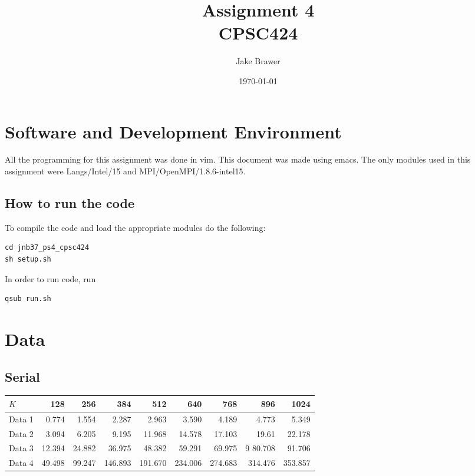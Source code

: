 \documentclass[11pt]{article}
\author{Jake Brawer}
\date{\today}
\title{Assignment 4\\\medskip
\large CPSC424}
\begin{document}
\maketitle


\section{Software and Development Environment}
\label{sec:org0f8da43}

All the programming for this assignment was done in vim. This document was made using emacs. The only modules used in this assignment were Langs/Intel/15 and MPI/OpenMPI/1.8.6-intel15.

\subsection{How to run the code}
\label{sec:orgbd0ddcf}

To compile the code and load the appropriate modules do the following:
\begin{verbatim}
cd jnb37_ps4_cpsc424
sh setup.sh
\end{verbatim}

In order to run code, run
\begin{verbatim}
qsub run.sh
\end{verbatim}

\section{Data}
\label{sec:org0c92dfd}
\subsection{Serial}
\label{sec:orgc05d892}
\begin{center}
\begin{tabular}{lrrrrrrrr}
\(K\) & 128 & 256 & 384 & 512 & 640 & 768 & 896 & 1024\\
\hline
Data 1 & 0.774 & 1.554 & 2.287 & 2.963 & 3.590 & 4.189 & 4.773 & 5.349\\
Data 2 & 3.094 & 6.205 & 9.195 & 11.968 & 14.578 & 17.103 & 19.61 & 22.178\\
Data 3 & 12.394 & 24.882 & 36.975 & 48.382 & 59.291 & 69.975 & 9  80.708 & 91.706\\
Data 4 & 49.498 & 99.247 & 146.893 & 191.670 & 234.006 & 274.683 & 314.476 & 353.857\\
\end{tabular}
\end{center}
\end{document}
